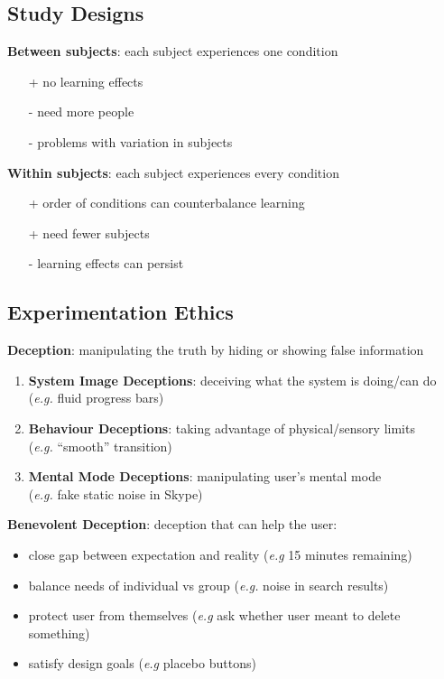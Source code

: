 \documentclass[]{article}
\theoremstyle{definition}
\begin{document}
	\subsection{Study Designs}
	\textbf{Between subjects}: each subject experiences one condition
	\begin{itemize}
		\item[+] no learning effects
		\item[-] need more people 
		\item[-] problems with variation in subjects
	\end{itemize}
	\textbf{Within subjects}: each subject experiences every condition
	\begin{itemize}
		\item[+] order of conditions can counterbalance learning
		\item[+] need fewer subjects
		\item[-] learning effects can persist
	\end{itemize}
		


	\subsection{Experimentation Ethics}
	\textbf{Deception}: manipulating the truth by hiding or showing false information
	\begin{enumerate}
		\item \textbf{System Image Deceptions}: deceiving what the system is doing/can do \\ (\textit{e.g.} fluid progress bars)
		\item \textbf{Behaviour Deceptions}: taking advantage of physical/sensory limits \\ (\textit{e.g.} ``smooth'' transition)
		\item \textbf{Mental Mode Deceptions}: manipulating user's mental mode \\ (\textit{e.g.} fake static noise in Skype)
	\end{enumerate}

	\textbf{Benevolent Deception}: deception that can help the user:
	\begin{itemize}
		\item close gap between expectation and reality (\textit{e.g} 15 minutes remaining)
		\item balance needs of individual vs group (\textit{e.g.} noise in search results)
		\item protect user from themselves (\textit{e.g} ask whether user meant to delete something)
		\item satisfy design goals (\textit{e.g} placebo buttons)
	\end{itemize}
\end{document}
